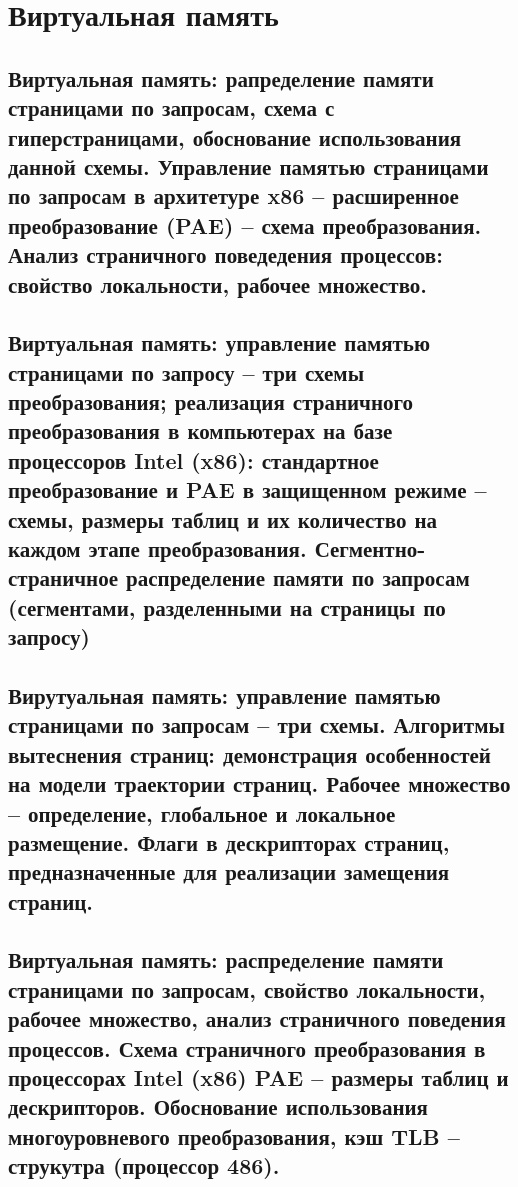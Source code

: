 \section{Виртуальная память}

\subsection{Виртуальная память: рапределение памяти страницами по запросам, схема с гиперстраницами, обоснование использования данной схемы. Управление памятью страницами по запросам в архитетуре x86 – расширенное преобразование (PAE) – схема преобразования. Анализ страничного поведедения процессов: свойство локальности, рабочее множество.}

\newpage

\subsection{Виртуальная память: управление памятью страницами по запросу – три схемы преобразования; реализация страничного преобразования в компьютерах на базе процессоров Intel (x86): стандартное преобразование и PAE в защищенном режиме – схемы, размеры таблиц и их количество на каждом этапе преобразования. Сегментно-страничное распределение памяти по запросам (сегментами, разделенными на страницы по запросу)}

\newpage

\subsection{Вирутуальная память: управление памятью страницами по запросам – три схемы. Алгоритмы вытеснения страниц: демонстрация особенностей на модели траектории страниц. Рабочее множество – определение, глобальное и локальное размещение. Флаги в дескрипторах страниц, предназначенные для реализации замещения страниц.}

\newpage

\subsection{Виртуальная память: распределение памяти страницами по запросам, свойство локальности, рабочее множество, анализ страничного поведения процессов. Схема страничного преобразования в процессорах Intel (x86) PAE – размеры таблиц и дескрипторов. Обоснование использования многоуровневого преобразования, кэш TLB – струкутра (процессор 486).}

